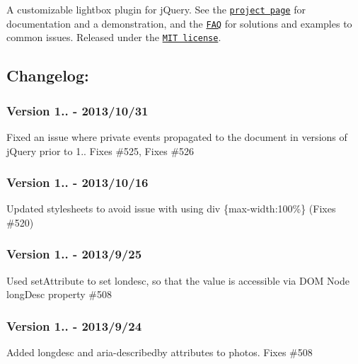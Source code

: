 A customizable lightbox plugin for j\-Query. See the \href{http://jacklmoore.com/colorbox/}{\tt project page} for documentation and a demonstration, and the \href{http://jacklmoore.com/colorbox/faq/}{\tt F\-A\-Q} for solutions and examples to common issues. Released under the \href{http://www.opensource.org/licenses/mit-license.php}{\tt M\-I\-T license}.

\subsection*{Changelog\-:}

\subsubsection*{Version 1.. -\/ 2013/10/31}


\begin{DoxyItemize}
\item Fixed an issue where private events propagated to the document in versions of j\-Query prior to 1.. Fixes \#525, Fixes \#526
\end{DoxyItemize}

\subsubsection*{Version 1.. -\/ 2013/10/16}


\begin{DoxyItemize}
\item Updated stylesheets to avoid issue with using {\ttfamily div \{max-\/width\-:100\%\}} (Fixes \#520)
\end{DoxyItemize}

\subsubsection*{Version 1.. -\/ 2013/9/25}


\begin{DoxyItemize}
\item Used set\-Attribute to set londesc, so that the value is accessible via D\-O\-M Node long\-Desc property \#508
\end{DoxyItemize}

\subsubsection*{Version 1.. -\/ 2013/9/24}


\begin{DoxyItemize}
\item Added longdesc and aria-\/describedby attributes to photos. Fixes \#508
\end{DoxyItemize}

